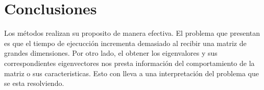 \section{Conclusiones}

Los métodos realizan su proposito de manera efectiva. El problema que presentan es que el tiempo de ejecucción incrementa demasiado al recibir una matriz de grandes dimensiones. Por otro lado, el obtener los eigenvalores y sus correspondientes eigenvectores nos presta información del comportamiento de la matriz o sus caracteristicas. Esto con lleva a una interpretación del problema que se esta resolviendo.